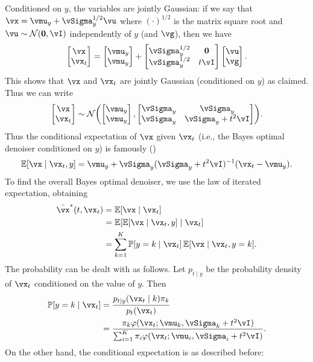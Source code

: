 \documentclass[../../book-main.tex]{subfiles}
\begin{document}
\begin{example}
	Conditioned on \(y\), the variables are jointly Gaussian: if we say that \(\vx = \vmu_{y} + \vSigma_{y}^{1/2}\vu\) where \((\cdot)^{1/2}\) is the matrix square root and \(\vu \sim \dNorm(\vzero, \vI)\) independently of \(y\) (and \(\vg\)), then we have
	\begin{equation}
		\mat{\vx \\ \vx_{t}} = \mat{\vmu_{y} \\ \vmu_{y}} + \mat{\vSigma_{y}^{1/2} & \vzero \\ \vSigma_{y}^{1/2} & t\vI}\mat{\vu \\ \vg}.
	\end{equation}
	This shows that \(\vx\) and \(\vx_{t}\) are jointly Gaussian (conditioned on \(y\)) as claimed. Thus we can write
	\begin{equation}
		\mat{\vx \\ \vx_{t}} \sim \dNorm\rp{\mat{\vmu_{y} \\ \vmu_{y}}, \mat{\vSigma_{y} & \vSigma_{y} \\ \vSigma_{y} & \vSigma_{y} + t^{2}\vI}}.
	\end{equation}
	Thus the conditional expectation of \(\vx\) given \(\vx_{t}\) (i.e., the
	Bayes optimal denoiser conditioned on \(y\)) is famously
	()
	\begin{equation}
		\Ex[\vx \mid \vx_{t}, y] = \vmu_{y} + \vSigma_{y}(\vSigma_{y} + t^{2}\vI)^{-1}(\vx_{t} - \vmu_{y}).
	\end{equation}
	To find the overall Bayes optimal denoiser, we use the law of iterated expectation, obtaining
	\begin{align}
		\bar{\vx}^{\ast}(t, \vx_{t})
		&= \Ex[\vx \mid \vx_{t}] \\ 
		&= \Ex[\Ex[\vx \mid \vx_{t}, y] \mid \vx_{t}] \\ 
		&= \sum_{k = 1}^{K}\Pr[y = k \mid \vx_{t}]\Ex[\vx \mid \vx_{t}, y = k].
	\end{align}
	The probability can be dealt with as follows. Let \(p_{t \mid y}\) be the probability density of \(\vx_{t}\) conditioned on the value of \(y\). Then
	\begin{align}
		\Pr[y = k \mid \vx_{t}]
		&= \frac{p_{t \mid y}(\vx_{t} \mid k)\pi_{k}}{p_{t}(\vx_{t})} \\ 
		&= \frac{\pi_{k}\phi(\vx_{t} ; \vmu_{k}, \vSigma_{k}
		+ t^{2}\vI)}{\sum_{i = 1}^{K}\pi_{i}\phi(\vx_{t} ; \vmu_{i}, \vSigma_{i} + t^{2}\vI)}.
	\end{align}
	On the other hand, the conditional expectation is as described before:

\end{example}
\end{document}
